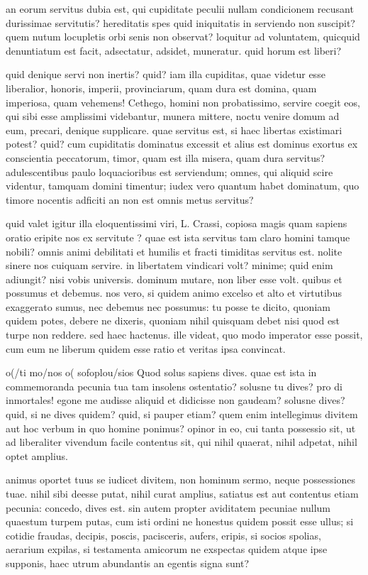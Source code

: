  an eorum servitus dubia est, qui cupiditate peculii nullam condicionem recusant durissimae servitutis? hereditatis spes quid iniquitatis in serviendo non suscipit? quem nutum locupletis orbi senis non observat? loquitur ad voluntatem, quicquid denuntiatum est facit, adsectatur, adsidet, muneratur. quid horum est liberi?

 quid denique servi non inertis? quid? iam illa cupiditas, quae videtur esse liberalior, honoris, imperii, provinciarum, quam dura est domina, quam imperiosa, quam vehemens! Cethego, homini non probatissimo, servire coegit eos, qui sibi esse amplissimi videbantur, munera mittere, noctu venire domum ad eum, precari, denique supplicare. quae servitus est, si haec libertas existimari potest? quid? cum cupiditatis dominatus excessit et alius est dominus exortus ex conscientia peccatorum, timor, quam est illa misera, quam dura servitus? adulescentibus paulo loquacioribus est serviendum; omnes, qui aliquid scire videntur, tamquam domini timentur; iudex vero quantum habet dominatum, quo timore nocentis adficiti an non est omnis metus servitus?

 quid valet igitur illa eloquentissimi viri, L. Crassi, copiosa magis quam sapiens oratio eripite nos ex servitute ? quae est ista servitus tam claro homini tamque nobili? omnis animi debilitati et humilis et fracti timiditas servitus est. nolite sinere nos cuiquam servire. in libertatem vindicari volt? minime; quid enim adiungit? nisi vobis universis. dominum mutare, non liber esse volt. quibus et possumus et debemus. nos vero, si quidem animo excelso et alto et virtutibus exaggerato sumus, nec debemus nec possumus: tu posse te dicito, quoniam quidem potes, debere ne dixeris, quoniam nihil quisquam debet nisi quod est turpe non reddere. sed haec hactenus. ille videat, quo modo imperator esse possit, cum eum ne liberum quidem esse ratio et veritas ipsa convincat.

 o(/ti mo/nos o( sofo\s plou/sios Quod solus sapiens dives. quae est ista in commemoranda pecunia tua tam insolens ostentatio? solusne tu dives? pro di inmortales! egone me audisse aliquid et didicisse non gaudeam? solusne dives? quid, si ne dives quidem? quid, si pauper etiam? quem enim intellegimus divitem aut hoc verbum in quo homine ponimus? opinor in eo, cui tanta possessio sit, ut ad liberaliter vivendum facile contentus sit, qui nihil quaerat, nihil adpetat, nihil optet amplius.

 animus oportet tuus se iudicet divitem, non hominum sermo, neque possessiones tuae. nihil sibi deesse putat, nihil curat amplius, satiatus est aut contentus etiam pecunia: concedo, dives est. sin autem propter aviditatem pecuniae nullum quaestum turpem putas, cum isti ordini ne honestus quidem possit esse ullus; si cotidie fraudas, decipis, poscis, pacisceris, aufers, eripis, si socios spolias, aerarium expilas, si testamenta amicorum ne exspectas quidem atque ipse supponis, haec utrum abundantis an egentis signa sunt?

